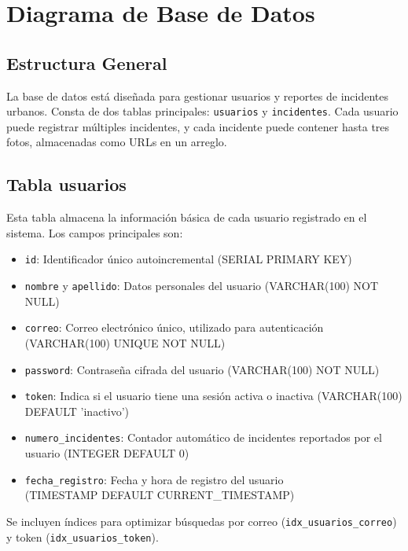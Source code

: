 \section{Diagrama de Base de Datos}

\subsection*{Estructura General}
La base de datos está diseñada para gestionar usuarios y reportes de incidentes urbanos. Consta de dos tablas principales: \texttt{usuarios} y \texttt{incidentes}. Cada usuario puede registrar múltiples incidentes, y cada incidente puede contener hasta tres fotos, almacenadas como URLs en un arreglo.

\subsection*{Tabla usuarios}
Esta tabla almacena la información básica de cada usuario registrado en el sistema. Los campos principales son:
\begin{itemize}
    \item \texttt{id}: Identificador único autoincremental (SERIAL PRIMARY KEY)
    \item \texttt{nombre} y \texttt{apellido}: Datos personales del usuario (VARCHAR(100) NOT NULL)
    \item \texttt{correo}: Correo electrónico único, utilizado para autenticación (VARCHAR(100) UNIQUE NOT NULL)
    \item \texttt{password}: Contraseña cifrada del usuario (VARCHAR(100) NOT NULL)
    \item \texttt{token}: Indica si el usuario tiene una sesión activa o inactiva (VARCHAR(100) DEFAULT 'inactivo')
    \item \texttt{numero\_incidentes}: Contador automático de incidentes reportados por el usuario (INTEGER DEFAULT 0)
    \item \texttt{fecha\_registro}: Fecha y hora de registro del usuario\\
    (TIMESTAMP DEFAULT CURRENT\_TIMESTAMP)
\end{itemize}
Se incluyen índices para optimizar búsquedas por correo (\texttt{idx\_usuarios\_correo})\\ y token (\texttt{idx\_usuarios\_token}).


